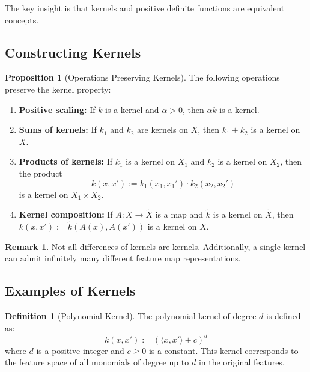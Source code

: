 \documentclass[12pt,a4paper]{article}
\theoremstyle{definition}
\newtheorem{definition}{Definition}[section]
\newtheorem{proposition}{Proposition}[section]
\newtheorem{remark}{Remark}[section]
\begin{document}
The key insight is that kernels and positive definite functions are equivalent concepts.

\subsection{Constructing Kernels}

\begin{proposition}[Operations Preserving Kernels]
The following operations preserve the kernel property:

\begin{enumerate}
    \item \textbf{Positive scaling:} If $k$ is a kernel and $\alpha > 0$, then $\alpha k$ is a kernel.
    
    \item \textbf{Sums of kernels:} If $k_1$ and $k_2$ are kernels on $X$, then $k_1 + k_2$ is a kernel on $X$.
    
    \item \textbf{Products of kernels:} If $k_1$ is a kernel on $X_1$ and $k_2$ is a kernel on $X_2$, then the product 
    \[
    k(x, x') := k_1(x_1, x_1') \cdot k_2(x_2, x_2')
    \]
    is a kernel on $X_1 \times X_2$.
    
    \item \textbf{Kernel composition:} If $A: X \to \tilde{X}$ is a map and $\tilde{k}$ is a kernel on $\tilde{X}$, then $k(x, x') := \tilde{k}(A(x), A(x'))$ is a kernel on $X$.
\end{enumerate}
\end{proposition}

\begin{remark}
Not all differences of kernels are kernels. Additionally, a single kernel can admit infinitely many different feature map representations.
\end{remark}

\subsection{Examples of Kernels}

\begin{definition}[Polynomial Kernel]
The polynomial kernel of degree $d$ is defined as:
\[
k(x, x') := (\langle x, x' \rangle + c)^d
\]
where $d$ is a positive integer and $c \geq 0$ is a constant. This kernel corresponds to the feature space of all monomials of degree up to $d$ in the original features.
\end{definition}
\end{document}
